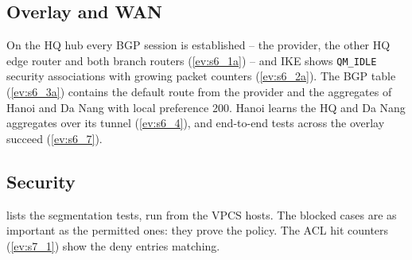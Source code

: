 \subsection{Overlay and WAN}\label{sec:test-overlay}
On the HQ hub every BGP session is established -- the provider, the other HQ edge router and both branch
routers (\cref{ev:s6_1a}) -- and IKE shows \texttt{QM\_IDLE} security associations with growing packet
counters (\cref{ev:s6_2a}). The BGP table (\cref{ev:s6_3a}) contains the default route from the provider
and the aggregates of Hanoi and Da Nang with local preference 200. Hanoi learns the HQ and Da Nang aggregates
over its tunnel (\cref{ev:s6_4}), and end-to-end tests across the overlay succeed (\cref{ev:s6_7}).

\subsection{Security}\label{sec:test-security}
 lists the segmentation tests, run from the VPCS hosts. The blocked cases are as
important as the permitted ones: they prove the policy. The ACL hit counters (\cref{ev:s7_1}) show the deny
entries matching.

